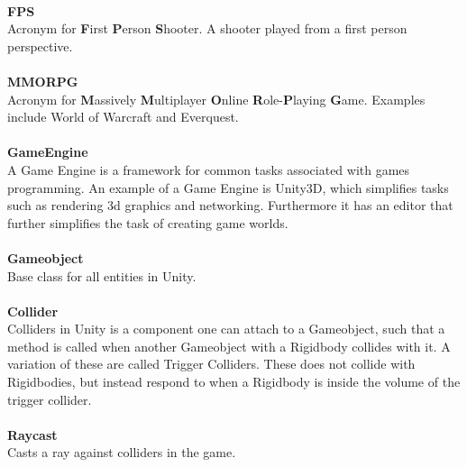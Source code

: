 \\
\textbf{FPS}\vspace{4pt}\\
Acronym for \textbf{F}irst \textbf{P}erson \textbf{S}hooter.
A shooter played from a first person perspective.\\
\\
\textbf{MMORPG}\vspace{4pt}\\
Acronym for \textbf{M}assively \textbf{M}ultiplayer \textbf{O}nline \textbf{R}ole-\textbf{P}laying \textbf{G}ame.
Examples include World of Warcraft and Everquest.\\
\\
\textbf{GameEngine}\vspace{4pt}\\
A Game Engine is a framework for common tasks associated with games programming.
An example of a Game Engine is Unity3D, which simplifies tasks such as rendering 3d graphics and networking.
Furthermore it has an editor that further simplifies the task of creating game worlds\cite{unityGameEngine}.\\
\\
\textbf{Gameobject}\vspace{4pt}\\
Base class for all entities in Unity.\cite{prefaceGameobject}\\
\\
\textbf{Collider}\vspace{4pt}\\
Colliders in Unity is a component one can attach to a Gameobject, such that a method is called when another Gameobject with a Rigidbody\cite{rigidbody} collides with it.\cite{collider2d}
A variation of these are called Trigger Colliders.
These does not collide with Rigidbodies, but instead respond to when a Rigidbody is inside the volume of the trigger collider.\cite{collider2dtrigger}\\
\\
\textbf{Raycast}\vspace{4pt}\\
Casts a ray against colliders in the game. \cite{raycast}\\